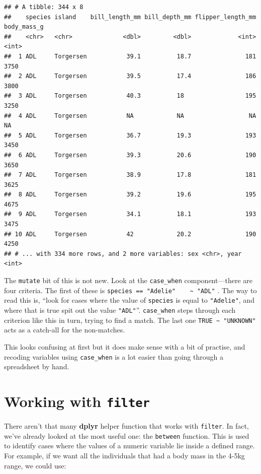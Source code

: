 \documentclass[
]{book}
\begin{document}
\begin{verbatim}
## # A tibble: 344 x 8
##    species island    bill_length_mm bill_depth_mm flipper_length_mm body_mass_g
##    <chr>   <chr>              <dbl>         <dbl>             <int>       <int>
##  1 ADL     Torgersen           39.1          18.7               181        3750
##  2 ADL     Torgersen           39.5          17.4               186        3800
##  3 ADL     Torgersen           40.3          18                 195        3250
##  4 ADL     Torgersen           NA            NA                  NA          NA
##  5 ADL     Torgersen           36.7          19.3               193        3450
##  6 ADL     Torgersen           39.3          20.6               190        3650
##  7 ADL     Torgersen           38.9          17.8               181        3625
##  8 ADL     Torgersen           39.2          19.6               195        4675
##  9 ADL     Torgersen           34.1          18.1               193        3475
## 10 ADL     Torgersen           42            20.2               190        4250
## # ... with 334 more rows, and 2 more variables: sex <chr>, year <int>
\end{verbatim}

The \texttt{mutate} bit of this is not new. Look at the \texttt{case\_when} component---there are four criteria. The first of these is \texttt{species\ ==\ "Adelie"\ \ \ \ \textasciitilde{}\ "ADL"} . The way to read this is, ``look for cases where the value of \texttt{species} is equal to \texttt{"Adelie"}, and where that is true spit out the value \texttt{"ADL"}''. \texttt{case\_when} steps through each criterion like this in turn, trying to find a match. The last one \texttt{TRUE\ \textasciitilde{}\ "UNKNOWN"} acts as a catch-all for the non-matches.

This looks confusing at first but it does make sense with a bit of practise, and recoding variables using \texttt{case\_when} is a lot easier than going through a spreadsheet by hand.

\hypertarget{working-with-filter}{%
\section{\texorpdfstring{Working with \texttt{filter}}{Working with filter}}\label{working-with-filter}}

There aren't that many \textbf{dplyr} helper function that works with \texttt{filter}. In fact, we've already looked at the most useful one: the \texttt{between} function. This is used to identify cases where the values of a numeric variable lie inside a defined range. For example, if we want all the individuals that had a body mass in the 4-5kg range, we could use:
\end{document}
